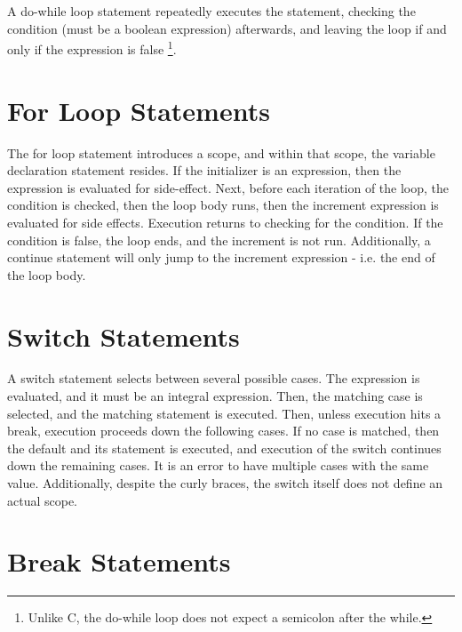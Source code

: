 \documentclass[letterpaper,12pt]{book}
\begin{document}
A do-while loop statement repeatedly executes the statement, checking the condition (must be a boolean expression) afterwards, and leaving the loop if and only if the expression is false
\footnote{Unlike C, the do-while loop does not expect a semicolon after the while.}.

\section{For Loop Statements}



The for loop statement introduces a scope, and within that scope, the variable declaration statement resides. If the initializer is an expression, then the expression is evaluated for side-effect. Next, before each iteration of the loop, the condition is checked, then the loop body runs, then the increment expression is evaluated for side effects. Execution returns to checking for the condition. If the condition is false, the loop ends, and the increment is not run. Additionally, a continue statement will only jump to the increment expression - i.e. the end of the loop body.

\section{Switch Statements}



A switch statement selects between several possible cases. The expression is evaluated, and it must be an integral expression. Then, the matching case is selected, and the matching statement is executed. Then, unless execution hits a break, execution proceeds down the following cases. If no case is matched, then the default and its statement is executed, and execution of the switch continues down the remaining cases. It is an error to have multiple cases with the same value. Additionally, despite the curly braces, the switch itself does not define an actual scope.

\section{Break Statements}


\end{document}
